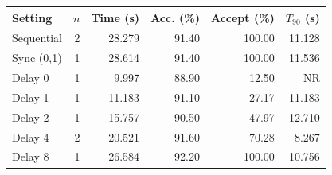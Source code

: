 \begin{tabular}{lrrrrr}\toprule
Setting & $n$ & Time (s) & Acc. (\%) & Accept (\%) & $T_{90}$ (s)\\\midrule
Sequential & 2 & 28.279 & 91.40 & 100.00 & 11.128 \\
Sync (0,1) & 1 & 28.614 & 91.40 & 100.00 & 11.536 \\
Delay 0 & 1 & 9.997 & 88.90 & 12.50 & NR \\
Delay 1 & 1 & 11.183 & 91.10 & 27.17 & 11.183 \\
Delay 2 & 1 & 15.757 & 90.50 & 47.97 & 12.710 \\
Delay 4 & 2 & 20.521 & 91.60 & 70.28 & 8.267 \\
Delay 8 & 1 & 26.584 & 92.20 & 100.00 & 10.756 \\
\bottomrule\end{tabular}
